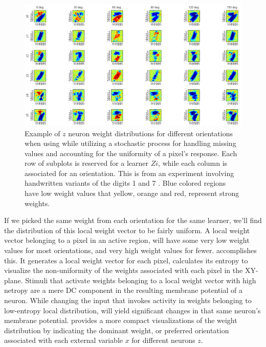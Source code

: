 \documentclass{report}
\begin{document}
\begin{figure}[ht]
\centering
\includegraphics[width=1.2\textwidth]{weightsPerOrientation}
\caption{Example of $z$ neuron weight distributions for different orientations when using while utilizing a stochastic process for handling missing values and accounting for the uniformity of a pixel's response. Each row of subplots is reserved for a learner $Zi$, while each column is associated for an orientation. This is from an experiment involving handwritten variants of the digits 1 and 7 \cite{LeCun1998}. Blue colored regions have low weight values that yellow, orange and red, represent strong weights.
\label{fig:weightsPerOrientation}}
\end{figure}

If we picked the same weight from each orientation for the same learner, we'll find the distribution of this local weight vector to be fairly uniform. A local weight vector belonging to a pixel in an active region, will have some very low weight values for most orientations, and very high weight values for fewer.  accomplishes this. It generates a local weight vector for each pixel, calculates its entropy to visualize the non-uniformity of the weights associated with each pixel in the XY-plane. Stimuli that activate weights belonging to a local weight vector with high netropy are a mere DC component in the resulting membrane potential of a neuron. While changing the input that invokes activity in weights belonging to low-entropy local distribution, will yield significant changes in that same neuron's membrane potential.  provides a more compact visualizations of the weight distribution by indicating the dominant weight, or preferred orientation associated with each external variable $x$ for different neurons $z$.
\end{document}

